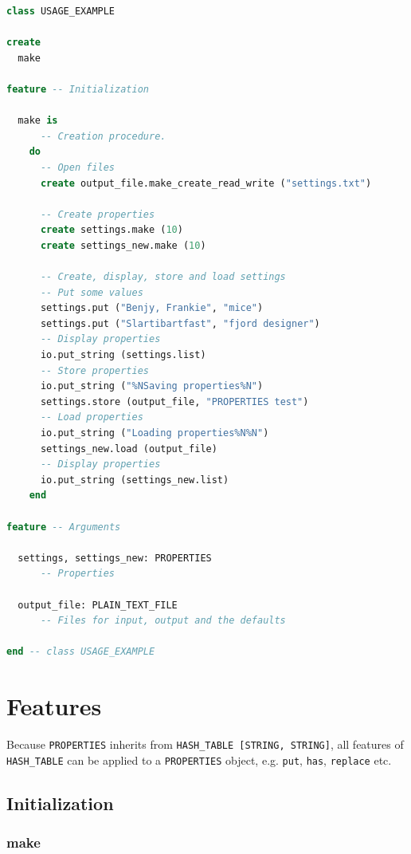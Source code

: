 \documentclass[a4paper,fleqn]{report}
\begin{document}
\begin{lstlisting}[language=Eiffel]
class USAGE_EXAMPLE

create 
  make

feature -- Initialization

  make is
      -- Creation procedure.
    do                  
      -- Open files
      create output_file.make_create_read_write ("settings.txt")
                        
      -- Create properties
      create settings.make (10)
      create settings_new.make (10)
                        
      -- Create, display, store and load settings
      -- Put some values
      settings.put ("Benjy, Frankie", "mice")
      settings.put ("Slartibartfast", "fjord designer")
      -- Display properties
      io.put_string (settings.list)
      -- Store properties
      io.put_string ("%NSaving properties%N")
      settings.store (output_file, "PROPERTIES test")
      -- Load properties
      io.put_string ("Loading properties%N%N")
      settings_new.load (output_file)
      -- Display properties
      io.put_string (settings_new.list)
    end
                
feature -- Arguments

  settings, settings_new: PROPERTIES
      -- Properties
                        
  output_file: PLAIN_TEXT_FILE
      -- Files for input, output and the defaults
        
end -- class USAGE_EXAMPLE
\end{lstlisting}


\chapter{Features}
\label{cha:features}

Because \texttt{PROPERTIES} inherits from \texttt{HASH\_TABLE [STRING,
  STRING]}, all features of \texttt{HASH\_TABLE} can be applied to a
\texttt{PROPERTIES} object, e.g. \texttt{put}, \texttt{has},
\texttt{replace} etc.

\section{Initialization}
\label{sec:initialization}


\subsection{make}
\label{sec:make}
\end{document}
